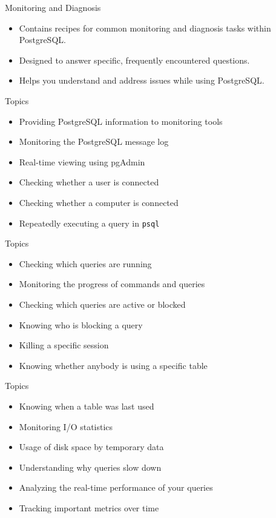 \documentclass[aspectratio=169]{beamer}
\begin{document}
\begin{frame}{Monitoring and Diagnosis}
\begin{itemize}
    \item Contains recipes for common monitoring and diagnosis tasks within PostgreSQL.
    \item Designed to answer specific, frequently encountered questions.
    \item Helps you understand and address issues while using PostgreSQL.
\end{itemize}
\end{frame}

\begin{frame}{Topics}
    \begin{itemize}
        \item Providing PostgreSQL information to monitoring tools
        \item Monitoring the PostgreSQL message log
        \item Real-time viewing using pgAdmin
        \item Checking whether a user is connected
        \item Checking whether a computer is connected
        \item Repeatedly executing a query in \texttt{psql}
    \end{itemize}
\end{frame}

\begin{frame}{Topics}
    \begin{itemize}
        \item Checking which queries are running
        \item Monitoring the progress of commands and queries
        \item Checking which queries are active or blocked
        \item Knowing who is blocking a query
        \item Killing a specific session
        \item Knowing whether anybody is using a specific table
    \end{itemize}
\end{frame}

\begin{frame}{Topics}
    \begin{itemize}
        \item Knowing when a table was last used
        \item Monitoring I/O statistics
        \item Usage of disk space by temporary data
        \item Understanding why queries slow down
        \item Analyzing the real-time performance of your queries
        \item Tracking important metrics over time
    \end{itemize}
\end{frame}
\end{document}
